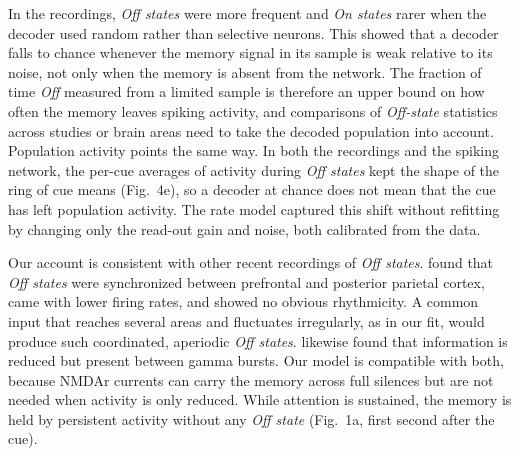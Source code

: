 \documentclass[11pt]{article}
\begin{document}
In the recordings, \emph{Off states} were more frequent and \emph{On states} rarer when the decoder used random rather than selective neurons. This showed that a decoder falls to chance whenever the memory signal in its sample is weak relative to its noise, not only when the memory is absent from the network. The fraction of time \emph{Off} measured from a limited sample is therefore an upper bound on how often the memory leaves spiking activity, and comparisons of \emph{Off-state} statistics across studies or brain areas need to take the decoded population into account. Population activity points the same way. In both the recordings and the spiking network, the per-cue averages of activity during \emph{Off states} kept the shape of the ring of cue means (Fig.~4e), so a decoder at chance does not mean that the cue has left population activity. The rate model captured this shift without refitting by changing only the read-out gain and noise, both calibrated from the data.

Our account is consistent with other recent recordings of \emph{Off states}. \citet{mozumder2026} found that \emph{Off states} were synchronized between prefrontal and posterior parietal cortex, came with lower firing rates, and showed no obvious rhythmicity. A common input that reaches several areas and fluctuates irregularly, as in our fit, would produce such coordinated, aperiodic \emph{Off states}. \citet{tao2024} likewise found that information is reduced but present between gamma bursts. Our model is compatible with both, because NMDAr currents can carry the memory across full silences but are not needed when activity is only reduced. While attention is sustained, the memory is held by persistent activity without any \emph{Off state} (Fig.~1a, first second after the cue).
\end{document}
